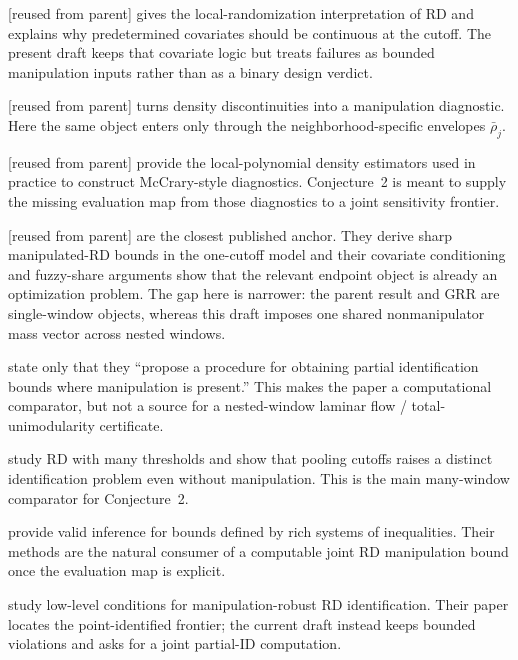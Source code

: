 \documentclass[11pt]{article}
\theoremstyle{definition}
\theoremstyle{plain}
\theoremstyle{remark}
\begin{document}
\citet{lee_2008_local_randomization} [reused from parent] gives the local-randomization
interpretation of RD and explains why predetermined covariates should be continuous at the
cutoff.  The present draft keeps that covariate logic but treats failures as bounded
manipulation inputs rather than as a binary design verdict.

\citet{mccrary_2008_density_test} [reused from parent] turns density discontinuities into a
manipulation diagnostic.  Here the same object enters only through the neighborhood-specific
envelopes \(\bar\rho_j\).

\citet{cattaneo_jansson_ma_2020_density} [reused from parent] provide the local-polynomial
density estimators used in practice to construct McCrary-style diagnostics.  Conjecture~2 is
meant to supply the missing evaluation map from those diagnostics to a joint sensitivity
frontier.

\citet[Abstract]{gerard_rokkanen_rothe_2020_rdbounds} [reused from parent] are the closest
published anchor.  They derive sharp manipulated-RD bounds in the one-cutoff model and their
covariate conditioning and fuzzy-share arguments show that the relevant endpoint object is
already an optimization problem.  The gap here is narrower: the parent result and GRR are
single-window objects, whereas this draft imposes one shared nonmanipulator mass vector across
nested windows.

\citet[Abstract, arXiv v4]{rosenman_rajkumar_gauriot_slonim_2019_discrete_manipulation} state
only that they ``propose a procedure for obtaining partial identification bounds where
manipulation is present.''  This makes the paper a computational comparator, but not a source
for a nested-window laminar flow / total-unimodularity certificate.

\citet[Abstract; pp.~216--217]{bertanha_2020_many_thresholds} study RD with many thresholds and
show that pooling cutoffs raises a distinct identification problem even without manipulation.
This is the main many-window comparator for Conjecture~2.

\citet[Abstract; p.~667]{chernozhukov_lee_rosen_2013_intersection_bounds} provide valid
inference for bounds defined by rich systems of inequalities.  Their methods are the natural
consumer of a computable joint RD manipulation bound once the evaluation map is explicit.

\citet{ishihara_sawada_2024_manipulation_robust} study low-level conditions for
manipulation-robust RD identification.  Their paper locates the point-identified frontier; the
current draft instead keeps bounded violations and asks for a joint partial-ID computation.
\end{document}

